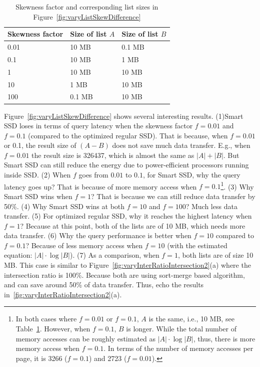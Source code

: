 \begin{table}[htbp]\small
\centering
\begin{tabular}{l|l|l}\hline\hline
\textbf{Skewness factor} & \textbf{Size of list $A$} & \textbf{Size of list} $B$\\\hline
0.01 & 10 MB & 0.1 MB\\\hline
0.1 & 10 MB & 1 MB\\\hline
1 & 10 MB & 10 MB\\\hline
10 & 1 MB & 10 MB \\\hline
100 & 0.1 MB & 10 MB\\\hline\hline
\end{tabular}
\caption{Skewness factor and corresponding list sizes in Figure~\ref{fig:varyListSkewDifference}}\label{tab:skewFactorDifference}
\end{table}

Figure~\ref{fig:varyListSkewDifference} shows several interesting results. (1)Smart SSD loses in terms of query latency when the skewness factor $f=0.01$ and $f=0.1$ (compared to the optimized regular SSD). That is because, when $f=0.01$ or 0.1, the result size of $(A-B)$ does not save much data transfer. E.g., when $f=0.01$ the result size is 326437, which is almost the same as $|A| + |B|$. But Smart SSD can still reduce the energy due to power-efficient processors running inside SSD. (2) When $f$ goes from $0.01$ to $0.1$, for Smart SSD, why the query latency goes up? That is because of more memory access when $f=0.1$\footnote{\small In both cases where $f=0.01$ or $f=0.1$, $A$ is the same, i.e., 10 MB, see Table~\ref{tab:skewFactorDifference}. However, when $f=0.1$, $B$ is longer. While the total number of memory accesses can be roughly estimated as $|A|\cdot\log |B|$, thus, there is more memory access when $f=0.1$. In terms of the number of memory accesses per page, it is 3266 ($f=0.1$) and 2723 ($f=0.01$).}. (3) Why Smart SSD wins when $f=1$? That is because we can still reduce data transfer by 50\%. (4) Why Smart SSD wins at both $f=10$ and $f=100$? Much less data transfer. (5) For optimized regular SSD, why it reaches the highest latency when $f=1$? Because at this point, both of the lists are of 10 MB, which needs more data transfer. (6) Why the query performance is better when $f=10$ compared to $f=0.1$? Because of less memory access when $f=10$ (with the estimated equation: $|A|\cdot\log |B|$). (7) As a comparison, when $f=1$, both lists are of size 10 MB. This case is similar to Figure~\ref{fig:varyInterRatioIntersection2}(a) where the intersection ratio is 100\%. Because both are using sort-merge based algorithm, and can save around 50\% of data transfer. Thus, echo the results in~\ref{fig:varyInterRatioIntersection2}(a).


